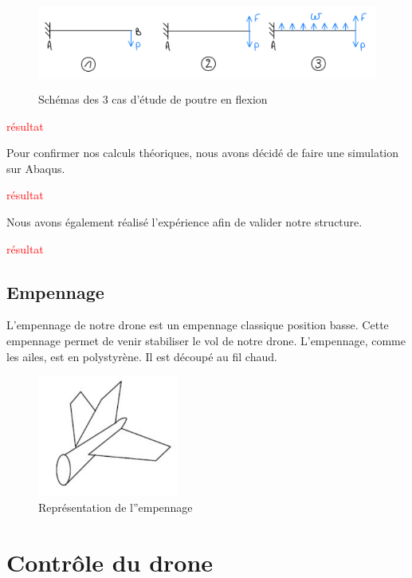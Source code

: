 \documentclass[a4paper,12pt,french]{report}
\begin{document}
\begin{figure}[h]
    \centering
    \includegraphics[height=3cm]{figures/flexion.jpeg}
    \caption{Schémas des 3 cas d'étude de poutre en flexion}
    \label{flex}
\end{figure}

\textcolor{red}{résultat}

Pour confirmer nos calculs théoriques, nous avons décidé de faire une simulation sur Abaqus.\newline

\textcolor{red}{résultat}

Nous avons également réalisé l'expérience afin de valider notre structure.\newline

\textcolor{red}{résultat}


\subsection{Empennage}

L'empennage de notre drone est un empennage classique position basse. Cette empennage permet de venir stabiliser le vol de notre drone. L'empennage, comme les ailes, est en polystyrène. Il est découpé au fil chaud.

\begin{figure}[h]
    \centering
    \includegraphics[height=4cm]{figures/emp.jpeg}
    \caption{Représentation de l''empennage}
    \label{flex}
\end{figure}

\newpage
\section{Contrôle du drone}
\end{document}
